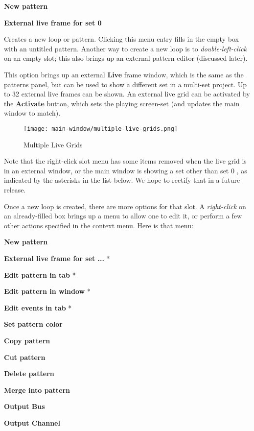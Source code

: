    \begin{enumber}
      \item \textbf{New pattern}
      \item \textbf{External live frame for set 0}
   \end{enumber}

   \setcounter{ItemCounter}{0}      %

   Creates a new loop or pattern.
   Clicking this menu entry fills in the empty box with an untitled
   pattern.  Another way to create a new loop is to
   \textsl{double-left-click} on an
   empty slot; this also brings up an external pattern editor (discussed
   later).

   This option brings up an external \textbf{Live} frame window, which
   is the same as the patterns panel, but can be used to show a different set
   in a multi-set project.  Up to 32 external live frames can be shown.
   An external live grid can be activated by the \textbf{Activate} button,
   which sets the playing screen-set
   (and updates the main window to match).

\begin{figure}[H]
   \centering 
   \texttt{[image: main-window/multiple-live-grids.png]}
   \caption{Multiple Live Grids}
   \label{fig:multiple_live_grids}
\end{figure}

   Note that the right-click slot menu has some items removed when the live
   grid is in an external window, or the main window is showing a set other
   than set 0 , as indicated by
   the asterisks in the list below.
   We hope to rectify that in a future release.

   Once a new loop is created, there are more options for that slot.
   A \textsl{right-click} on an already-filled box brings up a menu
   to allow one to edit it, or perform a few other actions
   specified in the context menu.  Here is that menu:

   \begin{enumber}
      \item \textbf{New pattern}
      \item \textbf{External live frame for set ...} *
      \item \textbf{Edit pattern in tab} *
      \item \textbf{Edit pattern in window} *
      \item \textbf{Edit events in tab} *
      \item \textbf{Set pattern color}
      \item \textbf{Copy pattern}
      \item \textbf{Cut pattern}
      \item \textbf{Delete pattern}
      \item \textbf{Merge into pattern}
      \item \textbf{Output Bus}
      \item \textbf{Output Channel}
   \end{enumber}

